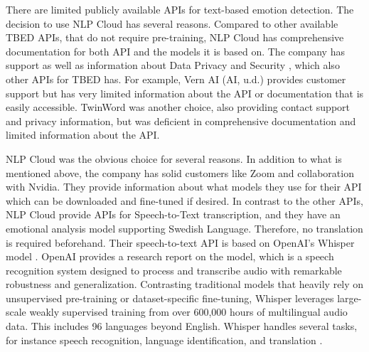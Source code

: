 There are limited publicly available APIs for text-based emotion detection. The decision to use NLP Cloud has several reasons. Compared to other available TBED APIs, that do not require pre-training, NLP Cloud has comprehensive documentation for both API and the models it is based on. The company has support as well as information about Data Privacy and Security \autocite{NLPCloud}, which also other APIs for TBED has. For example, Vern AI (AI, u.d.) provides customer support but has very limited information about the API or documentation that is easily accessible. TwinWord \autocite{TwinWord} was another choice, also providing contact support and privacy information, but was deficient in comprehensive documentation and limited information about the API. 

 NLP Cloud was the obvious choice for several reasons. In addition to what is mentioned above, the company has solid customers like Zoom and collaboration with Nvidia. They provide information about what models they use for their API which can be downloaded and fine-tuned if desired. In contrast to the other APIs, NLP Cloud provide APIs for Speech-to-Text transcription, and they have an emotional analysis model supporting Swedish Language. Therefore, no translation is required beforehand. Their speech-to-text API is based on OpenAI’s Whisper model \autocite{NLPCloud}. OpenAI provides a research report on the model, which is a speech recognition system designed to process and transcribe audio with remarkable robustness and generalization. Contrasting traditional models that heavily rely on unsupervised pre-training or dataset-specific fine-tuning, Whisper leverages large-scale weakly supervised training from over 600,000 hours of multilingual audio data. This includes 96 languages beyond English. Whisper handles several tasks, for instance speech recognition, language identification, and translation \autocite{Radford2022}. 

